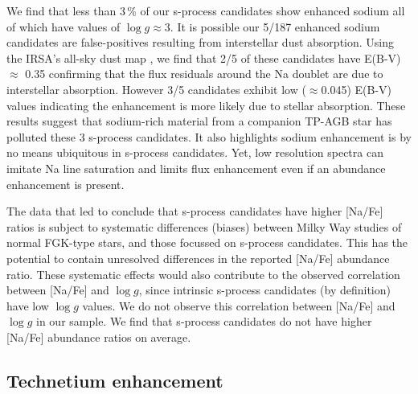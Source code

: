 \documentclass[a4paper,fleqn,usenatbib]{mnras}
\begin{document}
We find that less than $3$\,\% of our s-process candidates show enhanced sodium all of which have values of $\log{g} \approx 3$. It is possible our 5/187 enhanced sodium candidates are false-positives resulting from interstellar dust absorption. Using the IRSA's all-sky dust map \citep{schlafly2011}, we find that 2/5 of these candidates have E(B-V)$\approx$ 0.35 confirming that the flux residuals around the Na doublet are due to interstellar absorption. However 3/5 candidates exhibit low ($\approx$0.045) E(B-V) values indicating the enhancement is more likely due to stellar absorption. These results suggest that sodium-rich material from a companion TP-AGB star has polluted these 3 s-process candidates. It also highlights sodium enhancement is by no means ubiquitous in s-process candidates. Yet, low resolution spectra can imitate Na line saturation and limits flux enhancement even if an abundance enhancement is present.

The data that led \citet{decastro2016} to conclude that s-process candidates have higher [Na/Fe] ratios is subject to systematic differences (biases) between Milky Way studies of normal FGK-type stars, and those focussed on s-process candidates. This has the potential to contain unresolved differences in the reported [Na/Fe] abundance ratio. These systematic effects would also contribute to the observed correlation between [Na/Fe] and $\log{g}$, since intrinsic s-process candidates (by definition) have low $\log{g}$ values. We do not observe this correlation between [Na/Fe] and $\log{g}$ in our sample. We find that s-process candidates do not have higher [Na/Fe] abundance ratios on average.

\subsection{Technetium enhancement}
\end{document}
